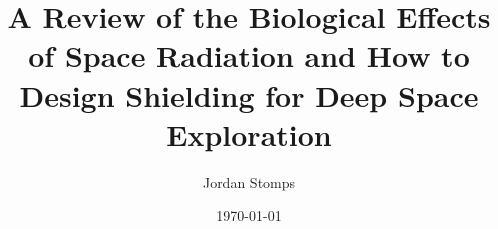 \documentclass{article}
\title{A Review of the Biological Effects of Space Radiation and How to Design Shielding for Deep Space Exploration}
\date{\today}
\author{Jordan Stomps}
\begin{document}
\maketitle



\pagebreak


\end{document}
